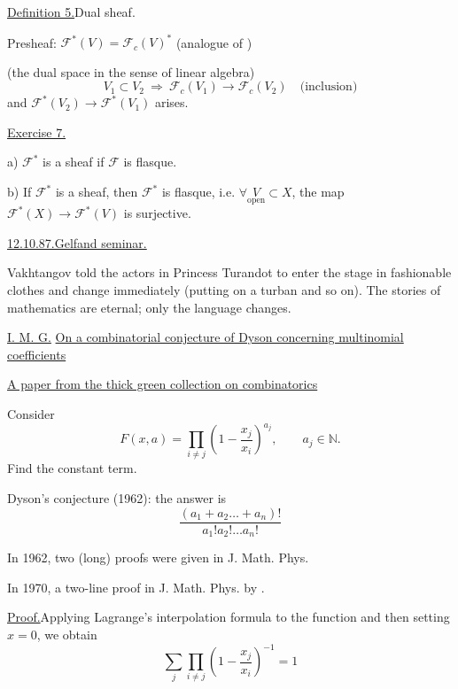 \underline{Definition 5.}\quad Dual sheaf.

Presheaf: $\mathcal F^*(V)=\mathcal F_c(V)^*$
(analogue of )

(the dual space in the sense of linear algebra)
\begin{equation*}
V_1\subset V_2\ \Rightarrow\ \mathcal F_c(V_1)\longrightarrow\mathcal F_c(V_2)
\quad\text{(inclusion)}
\end{equation*}
and $\mathcal F^*(V_2)\longrightarrow\mathcal F^*(V_1)$ arises.

\underline{Exercise 7.}

a) $\mathcal F^*$ is a sheaf if $\mathcal F$ is flasque.

b) If $\mathcal F^*$ is a sheaf, then $\mathcal F^*$ is flasque, i.e.
$\forall\underset{\text{open}}{V}\subset X$,
the map $\mathcal F^*(X)\longrightarrow\mathcal F^*(V)$ is surjective.


\underline{12.10.87.}\qquad \underline{Gelfand seminar.}

Vakhtangov told the actors in Princess Turandot to enter the stage in fashionable clothes
and change immediately (putting on a turban and so on). The stories of mathematics are eternal; only the language changes.

\underline{I. M. G.}\quad
\underline{On a combinatorial conjecture of Dyson concerning multinomial coefficients}

\underline{A paper from the thick green collection on combinatorics}

Consider
\begin{equation*}
F(x,a)=\prod_{i\neq j}\left(1-\frac{x_j}{x_i}\right)^{a_j},
\qquad a_j\in\mathbb N.\tag{1}
\end{equation*}
Find the constant term.

Dyson's conjecture (1962): the answer is
\begin{equation*}
\frac{(a_1+a_2\ldots+a_n)!}{a_1!a_2!\ldots a_n!}\tag{2}
\end{equation*}

In 1962, two (long) proofs were given in J. Math. Phys.

In 1970, a two-line proof in J. Math. Phys. by .

\underline{Proof.}\quad Applying Lagrange's interpolation formula to the function
and then setting $x=0$, we obtain
\begin{equation*}
\sum_j\prod_{i\neq j}\left(1-\frac{x_j}{x_i}\right)^{-1}=1\tag{3}
\end{equation*}

